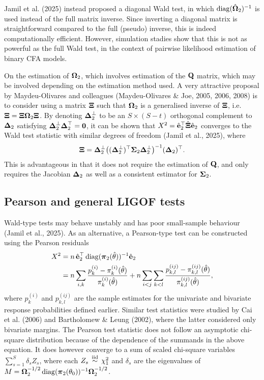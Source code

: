 \documentclass[
  letterpaper,
  DIV=11,
  numbers=noendperiod]{scrartcl}
\begin{document}
Jamil et al. (2025) instead proposed a diagonal Wald test, in which
\(\operatorname{diag}(\hat{{\boldsymbol\Omega}}_2)^{-1}\) is used instead of the full matrix
inverse. Since inverting a diagonal matrix is straightforward compared
to the full (pseudo) inverse, this is indeed computationally efficient.
However, simulation stadies show that this is not as powerful as the
full Wald test, in the context of pairwise likelihood estimation of
binary CFA models.

On the estimation of \({\boldsymbol\Omega}_2\), which involves estimation of the
\({\mathbf Q}\) matrix, which may be involved depending on the estimation method
used. A very attractive proposal by Maydeu-Olivares and colleagues
(Maydeu-Olivares \& Joe, 2005, 2006, 2008) is to consider using a matrix
\({\boldsymbol\Xi}\) such that \({\boldsymbol\Omega}_2\) is a generalised inverse of \({\boldsymbol\Xi}\),
i.e.~\({\boldsymbol\Xi} = {\boldsymbol\Xi} {\boldsymbol\Omega}_2 {\boldsymbol\Xi}\). By denoting \({\boldsymbol\Delta}_{2}^\perp\)
to be an \(S\times (S-t)\) orthogonal complement to \({\boldsymbol\Delta}_{2}\)
satisfying \({\boldsymbol\Delta}_{2}^\perp {\boldsymbol\Delta}_{2}^\top = {\mathbf 0}\), it can be
shown that \(X^2 = \hat{{\mathbf e}}_2^\top \hat{{\boldsymbol\Xi}} \hat{{\mathbf e}}_2\) converges to the
Wald test statistic with similar degrees of freedom (Jamil et al.,
2025), where \[
{\boldsymbol\Xi} = {\boldsymbol\Delta}_{2}^\perp \big( ({\boldsymbol\Delta}_{2}^\perp)^\top {\boldsymbol\Sigma}_2 {\boldsymbol\Delta}_{2}^\perp \big)^{-1} ({\boldsymbol\Delta}_{2})^\top.
\] This is advantageous in that it does not require the estimation of
\({\mathbf Q}\), and only requires the Jacobian \({\boldsymbol\Delta}_{2}\) as well as a
consistent estimator for \({\boldsymbol\Sigma}_2\).

\subsection{Pearson and general LIGOF
tests}\label{pearson-and-general-ligof-tests}

Wald-type tests may behave unstably and has poor small-sample behaviour
(Jamil et al., 2025). As an alternative, a Pearson-type test can be
constructed using the Pearson residuals \[
\begin{aligned}
X^2 
&= n \, \hat{{\mathbf e}}_2^\top \operatorname{diag}({\boldsymbol\pi}_2(\hat\theta))^{-1} \hat{{\mathbf e}}_2 \\
&= 
n \sum_{i,k} \frac{p_k^{(i)} - \pi_k^{(i)}(\hat\theta)}{\pi_k^{(i)}(\hat\theta)} +
n \sum_{i<j}\sum_{k<l} \frac{p_{k,l}^{(ij)} - \pi_{k,l}^{(ij)}(\hat\theta)}{\pi_{k,l}^{(ij)}(\hat\theta)},
\end{aligned}
\] where \(p_k^{(i)}\) and \(p_{k,l}^{(ij)}\) are the sample estimates
for the univariate and bivariate response probabilities defined earlier.
Similar test statistics were studied by Cai et al. (2006) and
Bartholomew \& Leung (2002), where the latter considered only bivariate
margins. The Pearson test statistic does not follow an asymptotic
chi-square distribution because of the dependence of the summands in the
above equation. It does however converge to a sum of scaled chi-square
variables \(\sum_{s=1}^S \delta_s Z_s\), where each
\(Z_s \,\overset{\text{iid}}{\sim}\, \chi^2_1\) and \(\delta_s\) are the eigenvalues of
\(M={\boldsymbol\Omega}_2^{-1/2} \operatorname{diag}({\boldsymbol\pi}_2(\theta_0))^{-1} {\boldsymbol\Omega}_2^{-1/2}\).
\end{document}
